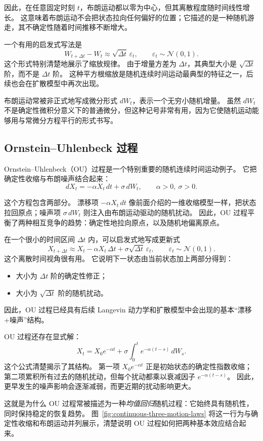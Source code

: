 因此，在任意固定时刻 $t$，布朗运动都以零为中心，但其离散程度随时间线性增长。
这意味着布朗运动不会把状态拉向任何偏好的位置；它描述的是一种随机游走，其不确定性随着时间推移不断增大。

一个有用的启发式写法是
\[
W_{t+\Delta t}-W_t \approx \sqrt{\Delta t}\,\varepsilon_t,
\qquad
\varepsilon_t\sim\mathcal{N}(0,1).
\]
这个形式特别清楚地展示了缩放规律。
由于增量方差为 $\Delta t$，其典型大小是 $\sqrt{\Delta t}$ 阶，而不是 $\Delta t$ 阶。
这种平方根缩放是随机连续时间运动最典型的特征之一，后续也会在扩散模型中再次出现。

布朗运动常被非正式地写成微分形式 $dW_t$，表示一个无穷小随机增量。
虽然 $dW_t$ 不是确定性微积分意义下的普通微分，但这种记号非常有用，因为它使随机运动能够用与常微分方程平行的形式书写。

\subsection{Ornstein--Uhlenbeck 过程}

Ornstein--Uhlenbeck（OU）过程是一个特别重要的随机连续时间运动例子。
它把确定性收缩与布朗噪声结合起来：
\[
dX_t=-\alpha X_t\,dt+\sigma\,dW_t,
\qquad
\alpha>0,\ \sigma>0.
\]

这个方程包含两部分。
漂移项 $-\alpha X_t\,dt$ 像前面介绍的一维收缩模型一样，把状态拉回原点；噪声项 $\sigma\,dW_t$ 则注入由布朗运动驱动的随机扰动。
因此，OU 过程平衡了两种相互竞争的趋势：确定性地拉向原点，以及随机地偏离原点。

在一个很小的时间区间 $\Delta t$ 内，可以启发式地写成更新式
\[
X_{t+\Delta t}
\approx
X_t-\alpha X_t\,\Delta t+\sigma\sqrt{\Delta t}\,\varepsilon_t,
\qquad
\varepsilon_t\sim\mathcal{N}(0,1).
\]
这个离散时间视角很有用。
它说明下一状态由当前状态加上两部分得到：
\begin{itemize}
    \item 大小为 $\Delta t$ 阶的确定性修正；
    \item 大小为 $\sqrt{\Delta t}$ 阶的随机扰动。
\end{itemize}
因此，OU 过程已经具有后续 Langevin 动力学和扩散模型中会出现的基本“漂移+噪声”结构。

OU 过程还存在显式解：
\[
X_t
=
X_0e^{-\alpha t}
+
\sigma \int_0^t e^{-\alpha(t-s)}\,dW_s.
\]
这个公式清楚揭示了其结构。
第一项 $X_0e^{-\alpha t}$ 正是初始状态的确定性指数收缩；第二项累积所有过去的随机扰动，但每个扰动都乘以衰减因子 $e^{-\alpha(t-s)}$。
因此，更早发生的噪声影响会逐渐减弱，而更近期的扰动影响更大。

这就是为什么 OU 过程常被描述为一种\emph{均值回归}随机过程：它始终具有随机性，同时保持稳定的恢复趋势。
图~\ref{fig:continuous-three-motion-laws} 将这一行为与确定性收缩和布朗运动并列展示，清楚说明 OU 过程如何把两种基本效应结合起来。

